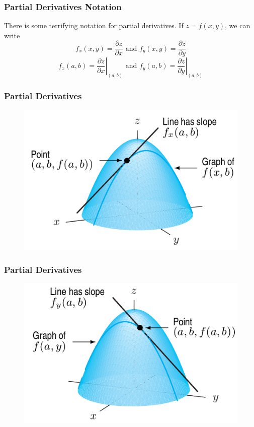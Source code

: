 \documentclass[xcolor=dvipsnames]{beamer}
\begin{document}
\begin{frame}
  \frametitle{Partial Derivatives Notation}
  There is some terrifying notation for partial derivatives. If
  $z=f(x,y)$, we can write
  \begin{equation}
    \label{eq:eequaeru}
f_{x}(x,y)=\frac{\partial{}z}{\partial{}x}\mbox{ and }f_{y}(x,y)=\frac{\partial{}z}{\partial{}y}
  \end{equation}
  \begin{equation}
    \label{eq:quohkahr}
f_{x}(a,b)=\left.\frac{\partial{}z}{\partial{}x}\right\vert_{(a,b)}\mbox{ and }f_{y}(a,b)=\left.\frac{\partial{}z}{\partial{}y}\right\vert_{(a,b)}
  \end{equation}
\end{frame}

\begin{frame}
  \frametitle{Partial Derivatives}
  \begin{figure}[h]
    \includegraphics[scale=0.5]{./diagrams/partialx.png}
  \end{figure}
\end{frame}

\begin{frame}
  \frametitle{Partial Derivatives}
  \begin{figure}[h]
    \includegraphics[scale=0.5]{./diagrams/partialy.png}
  \end{figure}
\end{frame}
\end{document}
